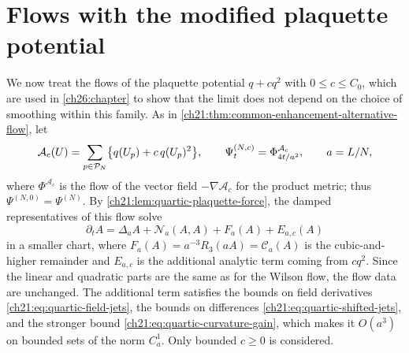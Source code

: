 \section{Flows with the modified plaquette potential}\label{ch22:sec:modified}

We now treat the flows of the plaquette potential $q+cq^2$ with $0\le c\le C_0$, which are used in \cref{ch26:chapter} to show that the limit does not depend on the choice of smoothing within this family. As in \cref{ch21:thm:common-enhancement-alternative-flow}, let
\[
 \mathcal A_c(U)=\sum_{p\in\mathcal P_{N}}\bigl\{q(U_p)+c\,q(U_p)^2\bigr\},\qquad \Psi_t^{(N,c)}=\Phi^{\mathcal A_c}_{4t/a^2},\qquad a=L/N,
\]
where $\Phi^{\mathcal A_c}$ is the flow of the vector field $-\nabla\mathcal A_c$ for the product metric; thus $\Psi^{(N,0)}=\Psi^{(N)}$. By \cref{ch21:lem:quartic-plaquette-force}, the damped representatives of this flow solve
\[
 \partial_tA=\Delta_aA+\mathcal N_a(A,A)+F_a(A)+E_{a,c}(A)
\]
in a smaller chart, where $F_a(A)=a^{-3}R_3(aA)=\mathscr C_a(A)$ is the cubic-and-higher remainder and $E_{a,c}$ is the additional analytic term coming from $cq^2$. Since the linear and quadratic parts are the same as for the Wilson flow, the flow data are unchanged. The additional term satisfies the bounds on field derivatives \eqref{ch21:eq:quartic-field-jets}, the bounds on differences \eqref{ch21:eq:quartic-shifted-jets}, and the stronger bound \eqref{ch21:eq:quartic-curvature-gain}, which makes it $O(a^3)$ on bounded sets of the norm $C_a^1$. Only bounded $c\ge0$ is considered.

